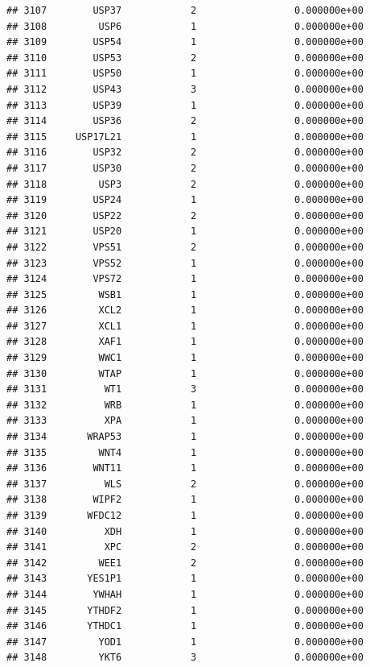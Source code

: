 \documentclass[
]{article}
\begin{document}
\begin{verbatim}
## 3107        USP37            2                 0.000000e+00
## 3108         USP6            1                 0.000000e+00
## 3109        USP54            1                 0.000000e+00
## 3110        USP53            2                 0.000000e+00
## 3111        USP50            1                 0.000000e+00
## 3112        USP43            3                 0.000000e+00
## 3113        USP39            1                 0.000000e+00
## 3114        USP36            2                 0.000000e+00
## 3115     USP17L21            1                 0.000000e+00
## 3116        USP32            2                 0.000000e+00
## 3117        USP30            2                 0.000000e+00
## 3118         USP3            2                 0.000000e+00
## 3119        USP24            1                 0.000000e+00
## 3120        USP22            2                 0.000000e+00
## 3121        USP20            1                 0.000000e+00
## 3122        VPS51            2                 0.000000e+00
## 3123        VPS52            1                 0.000000e+00
## 3124        VPS72            1                 0.000000e+00
## 3125         WSB1            1                 0.000000e+00
## 3126         XCL2            1                 0.000000e+00
## 3127         XCL1            1                 0.000000e+00
## 3128         XAF1            1                 0.000000e+00
## 3129         WWC1            1                 0.000000e+00
## 3130         WTAP            1                 0.000000e+00
## 3131          WT1            3                 0.000000e+00
## 3132          WRB            1                 0.000000e+00
## 3133          XPA            1                 0.000000e+00
## 3134       WRAP53            1                 0.000000e+00
## 3135         WNT4            1                 0.000000e+00
## 3136        WNT11            1                 0.000000e+00
## 3137          WLS            2                 0.000000e+00
## 3138        WIPF2            1                 0.000000e+00
## 3139       WFDC12            1                 0.000000e+00
## 3140          XDH            1                 0.000000e+00
## 3141          XPC            2                 0.000000e+00
## 3142         WEE1            2                 0.000000e+00
## 3143       YES1P1            1                 0.000000e+00
## 3144        YWHAH            1                 0.000000e+00
## 3145       YTHDF2            1                 0.000000e+00
## 3146       YTHDC1            1                 0.000000e+00
## 3147         YOD1            1                 0.000000e+00
## 3148         YKT6            3                 0.000000e+00

\end{verbatim}
\end{document}
